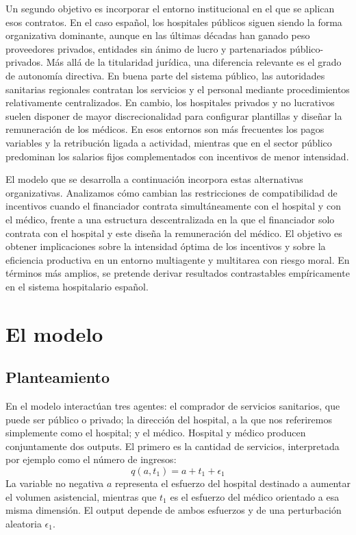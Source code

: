 ﻿\documentclass[12pt,letterpaper]{article}
\begin{document}
Un segundo objetivo es incorporar el entorno institucional en el que se aplican esos contratos. En el caso espa\~nol, los hospitales p\'ublicos siguen siendo la forma organizativa dominante, aunque en las \'ultimas d\'ecadas han ganado peso proveedores privados, entidades sin \'animo de lucro y partenariados p\'ublico-privados. M\'as all\'a de la titularidad jur\'idica, una diferencia relevante es el grado de autonom\'ia directiva. En buena parte del sistema p\'ublico, las autoridades sanitarias regionales contratan los servicios y el personal mediante procedimientos relativamente centralizados. En cambio, los hospitales privados y no lucrativos suelen disponer de mayor discrecionalidad para configurar plantillas y dise\~nar la remuneraci\'on de los m\'edicos. En esos entornos son m\'as frecuentes los pagos variables y la retribuci\'on ligada a actividad, mientras que en el sector p\'ublico predominan los salarios fijos complementados con incentivos de menor intensidad.

El modelo que se desarrolla a continuaci\'on incorpora estas alternativas organizativas. Analizamos c\'omo cambian las restricciones de compatibilidad de incentivos cuando el financiador contrata simult\'aneamente con el hospital y con el m\'edico, frente a una estructura descentralizada en la que el financiador solo contrata con el hospital y este dise\~na la remuneraci\'on del m\'edico. El objetivo es obtener implicaciones sobre la intensidad \'optima de los incentivos y sobre la eficiencia productiva en un entorno multiagente y multitarea con riesgo moral. En t\'erminos m\'as amplios, se pretende derivar resultados contrastables emp\'iricamente en el sistema hospitalario espa\~nol.

\section{El modelo}

\subsection{Planteamiento}
En el modelo interact\'uan tres agentes: el comprador de servicios sanitarios, que puede ser p\'ublico o privado; la direcci\'on del hospital, a la que nos referiremos simplemente como el hospital; y el m\'edico. Hospital y m\'edico producen conjuntamente dos outputs. El primero es la cantidad de servicios, interpretada por ejemplo como el n\'umero de ingresos:
\begin{equation*}\label{eq:qes}
  q(a,t_1)=a+t_1+\epsilon_1
\end{equation*}
La variable no negativa $a$ representa el esfuerzo del hospital destinado a aumentar el volumen asistencial, mientras que $t_1$ es el esfuerzo del m\'edico orientado a esa misma dimensi\'on. El output depende de ambos esfuerzos y de una perturbaci\'on aleatoria $\epsilon_1$.
\end{document}
